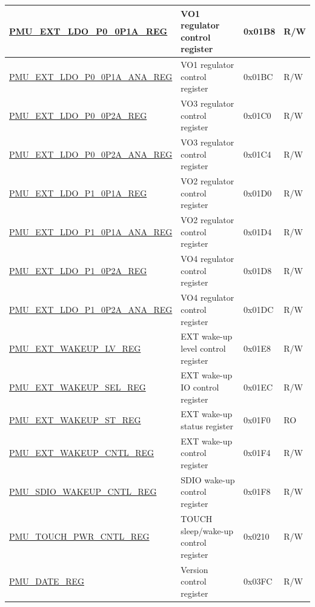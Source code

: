 \begin{longtable}{ | l | L{6cm} | l | l | }
\hyperref[regdesc:PMUEXTLDOP00P1AREG]{PMU\_EXT\_LDO\_P0\_0P1A\_REG} & VO1 regulator control register & 0x01B8 & R/W \\ \hline
\hyperref[regdesc:PMUEXTLDOP00P1AANAREG]{PMU\_EXT\_LDO\_P0\_0P1A\_ANA\_REG} & VO1 regulator control register  & 0x01BC & R/W \\ \hline
\hyperref[regdesc:PMUEXTLDOP00P2AREG]{PMU\_EXT\_LDO\_P0\_0P2A\_REG} & VO3 regulator control register  & 0x01C0 & R/W \\ \hline
\hyperref[regdesc:PMUEXTLDOP00P2AANAREG]{PMU\_EXT\_LDO\_P0\_0P2A\_ANA\_REG} & VO3 regulator control register & 0x01C4 & R/W \\ \hline

\hyperref[regdesc:PMUEXTLDOP10P1AREG]{PMU\_EXT\_LDO\_P1\_0P1A\_REG} & VO2 regulator control register & 0x01D0 & R/W \\ \hline
\hyperref[regdesc:PMUEXTLDOP10P1AANAREG]{PMU\_EXT\_LDO\_P1\_0P1A\_ANA\_REG} & VO2 regulator control register & 0x01D4 & R/W \\ \hline
\hyperref[regdesc:PMUEXTLDOP10P2AREG]{PMU\_EXT\_LDO\_P1\_0P2A\_REG} & VO4 regulator control register & 0x01D8 & R/W \\ \hline
\hyperref[regdesc:PMUEXTLDOP10P2AANAREG]{PMU\_EXT\_LDO\_P1\_0P2A\_ANA\_REG} & VO4 regulator control register & 0x01DC & R/W \\ \hline

\hyperref[regdesc:PMUEXTWAKEUPLVREG]{PMU\_EXT\_WAKEUP\_LV\_REG} & EXT wake-up level control register & 0x01E8 & R/W \\ \hline
\hyperref[regdesc:PMUEXTWAKEUPSELREG]{PMU\_EXT\_WAKEUP\_SEL\_REG} & EXT wake-up IO control register & 0x01EC & R/W \\ \hline
\hyperref[regdesc:PMUEXTWAKEUPSTREG]{PMU\_EXT\_WAKEUP\_ST\_REG} & EXT wake-up status register & 0x01F0 & RO \\ \hline
\hyperref[regdesc:PMUEXTWAKEUPCNTLREG]{PMU\_EXT\_WAKEUP\_CNTL\_REG} & EXT wake-up control register & 0x01F4 & R/W \\ \hline
\hyperref[regdesc:PMUSDIOWAKEUPCNTLREG]{PMU\_SDIO\_WAKEUP\_CNTL\_REG} & SDIO wake-up control register & 0x01F8 & R/W \\ \hline

\hyperref[regdesc:PMUTOUCHPWRCNTLREG]{PMU\_TOUCH\_PWR\_CNTL\_REG} & TOUCH sleep/wake-up control register & 0x0210 & R/W \\ \hline

\hyperref[regdesc:PMUDATEREG]{PMU\_DATE\_REG} & Version control register & 0x03FC & R/W \\ \hline

\end{longtable}
